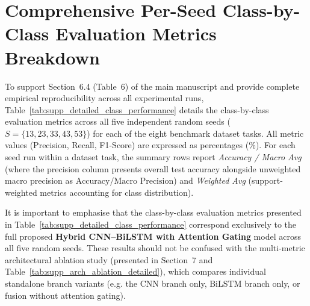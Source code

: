 \documentclass[a4paper,fleqn]{cas-sc}
\begin{document}
\section{Comprehensive Per-Seed Class-by-Class Evaluation Metrics Breakdown}
\label{sec:supp_detailed_class_perf}
To support Section~6.4 (Table~6) of the main manuscript and provide complete empirical reproducibility across all experimental runs, Table~\ref{tab:supp_detailed_class_performance} details the class-by-class evaluation metrics across all five independent random seeds ($S=\{13, 23, 33, 43, 53\}$) for each of the eight benchmark dataset tasks. All metric values (Precision, Recall, F1-Score) are expressed as percentages (\%). For each seed run within a dataset task, the summary rows report \textit{Accuracy / Macro Avg} (where the precision column presents overall test accuracy alongside unweighted macro precision as $\text{Accuracy} / \text{Macro Precision}$) and \textit{Weighted Avg} (support-weighted metrics accounting for class distribution).

It is important to emphasise that the class-by-class evaluation metrics presented in Table~\ref{tab:supp_detailed_class_performance} correspond exclusively to the full proposed \textbf{Hybrid CNN--BiLSTM with Attention Gating} model across all five random seeds. These results should not be confused with the multi-metric architectural ablation study (presented in Section~7 and Table~\ref{tab:supp_arch_ablation_detailed}), which compares individual standalone branch variants (e.g. the CNN branch only, BiLSTM branch only, or fusion without attention gating).
\end{document}
